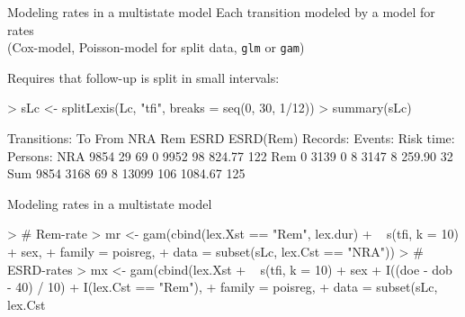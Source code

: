 \begin{frame}[fragile]{Modeling rates in a multistate model}
\pause
Each transition modeled by a model for rates\\ (Cox-model,
Poisson-model for split data, \texttt{glm} or \texttt{gam})

Requires that follow-up is split in small intervals:
\begin{Schunk}
\begin{Sinput}
> sLc <- splitLexis(Lc, "tfi", breaks = seq(0, 30, 1/12))
> summary(sLc)
\end{Sinput}
\begin{Soutput}
Transitions:
     To
From   NRA  Rem ESRD ESRD(Rem)  Records:  Events: Risk time:  Persons:
  NRA 9854   29   69         0      9952       98     824.77       122
  Rem    0 3139    0         8      3147        8     259.90        32
  Sum 9854 3168   69         8     13099      106    1084.67       125
\end{Soutput}
\end{Schunk}
\end{frame}

\begin{frame}[fragile]{Modeling rates in a multistate model}
\begin{Schunk}
\begin{Sinput}
> # Rem-rate
> mr <- gam(cbind(lex.Xst == "Rem", lex.dur)
+           ~ s(tfi, k = 10) + sex,
+           family = poisreg,
+             data = subset(sLc, lex.Cst == "NRA"))
> # ESRD-rates
> mx <- gam(cbind(lex.Xst %
+           ~ s(tfi, k = 10) + sex + I((doe - dob - 40) / 10) + I(lex.Cst == "Rem"),
+           family = poisreg,
+             data = subset(sLc, lex.Cst %
\end{Sinput}
\end{Schunk}
\end{frame}

